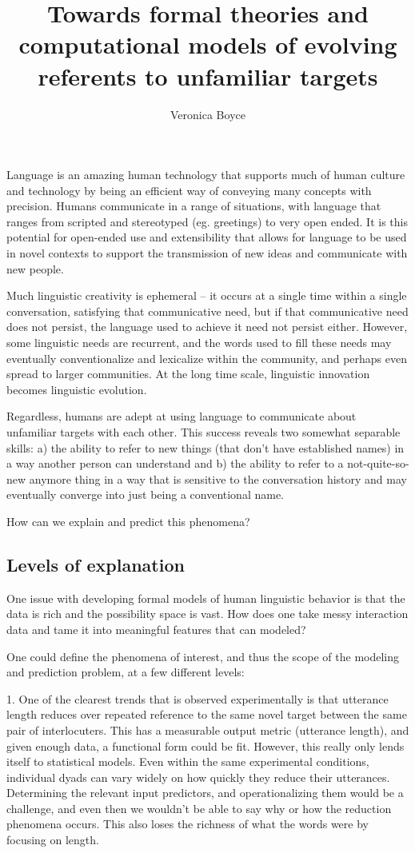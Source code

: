 \documentclass[]{article}
\title{Towards formal theories and computational models of evolving referents to unfamiliar targets}
\author{Veronica Boyce}
\begin{document}
	
	\maketitle
	
	
	Language is an amazing human technology that supports much of human culture and technology by being an efficient way of conveying many concepts with precision. Humans communicate in a range of situations, with language that ranges from scripted and stereotyped (eg. greetings) to very open ended. It is this potential for open-ended use and extensibility that allows for language to be used in novel contexts to support the transmission of new ideas and communicate with new people. 
	
	Much linguistic creativity is ephemeral -- it occurs at a single time within a single conversation, satisfying that communicative need, but if that communicative need does not persist, the language used to achieve it need not persist either. However, some linguistic needs are recurrent, and the words used to fill these needs may eventually conventionalize and lexicalize within the community, and perhaps even spread to larger communities. At the long time scale, linguistic innovation becomes linguistic evolution. 
	
	Regardless, humans are adept at using language to communicate about unfamiliar targets with each other. This success reveals two somewhat separable skills: a) the ability to refer to new things (that don't have established names) in a way another person can understand and b) the ability to refer to a not-quite-so-new anymore thing in a way that is sensitive to the conversation history and may eventually converge into just being a conventional name. 
	
	How can we explain and predict this phenomena?
	
	\subsection{Levels of explanation}
	One issue with developing formal models of human linguistic behavior is that the data is rich and the possibility space is vast. How does one take messy interaction data and tame it into meaningful features that can modeled? 
	
	One could define the phenomena of interest, and thus the scope of the modeling and prediction problem, at a few different levels:
	
	1. One of the clearest trends that is observed experimentally is that utterance length reduces over repeated reference to the same novel target between the same pair of interlocuters. This has a measurable output metric (utterance length), and given enough data, a functional form could be fit. However, this really only lends itself to statistical models. Even within the same experimental conditions, individual dyads can vary widely on how quickly they reduce their utterances. Determining the relevant input predictors, and operationalizing them would be a challenge, and even then we wouldn't be able to say why or how the reduction phenomena occurs. This also loses the richness of what the words were by focusing on length.
	
\end{document}
